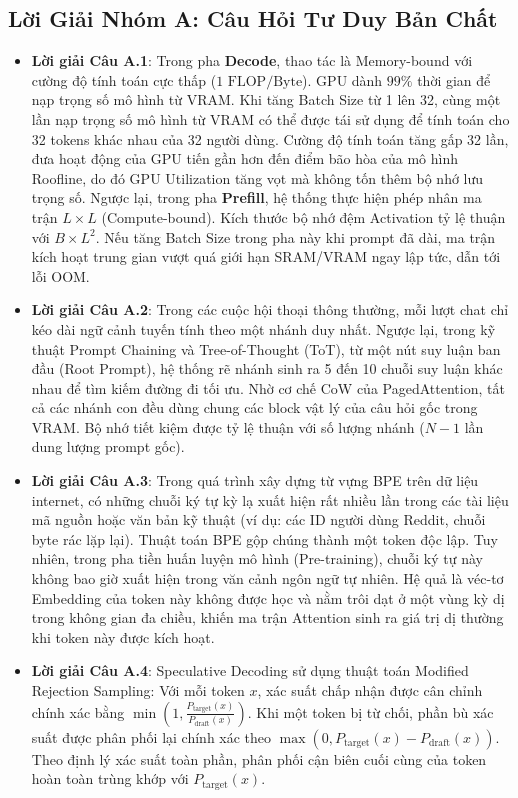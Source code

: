 \subsection{Lời Giải Nhóm A: Câu Hỏi Tư Duy Bản Chất}
\begin{itemize}
  \item \textbf{Lời giải Câu A.1}:
  Trong pha \textbf{Decode}, thao tác là Memory-bound với cường độ tính toán cực thấp ($1\text{ FLOP/Byte}$). GPU dành $99\%$ thời gian để nạp trọng số mô hình từ VRAM. Khi tăng Batch Size từ 1 lên 32, cùng một lần nạp trọng số mô hình từ VRAM có thể được tái sử dụng để tính toán cho 32 tokens khác nhau của 32 người dùng. Cường độ tính toán tăng gấp 32 lần, đưa hoạt động của GPU tiến gần hơn đến điểm bão hòa của mô hình Roofline, do đó GPU Utilization tăng vọt mà không tốn thêm bộ nhớ lưu trọng số.
  Ngược lại, trong pha \textbf{Prefill}, hệ thống thực hiện phép nhân ma trận $L \times L$ (Compute-bound). Kích thước bộ nhớ đệm Activation tỷ lệ thuận với $B \times L^2$. Nếu tăng Batch Size trong pha này khi prompt đã dài, ma trận kích hoạt trung gian vượt quá giới hạn SRAM/VRAM ngay lập tức, dẫn tới lỗi OOM.

  \item \textbf{Lời giải Câu A.2}:
  Trong các cuộc hội thoại thông thường, mỗi lượt chat chỉ kéo dài ngữ cảnh tuyến tính theo một nhánh duy nhất. Ngược lại, trong kỹ thuật Prompt Chaining và Tree-of-Thought (ToT), từ một nút suy luận ban đầu (Root Prompt), hệ thống rẽ nhánh sinh ra 5 đến 10 chuỗi suy luận khác nhau để tìm kiếm đường đi tối ưu. Nhờ cơ chế CoW của PagedAttention, tất cả các nhánh con đều dùng chung các block vật lý của câu hỏi gốc trong VRAM. Bộ nhớ tiết kiệm được tỷ lệ thuận với số lượng nhánh ($N-1$ lần dung lượng prompt gốc).

  \item \textbf{Lời giải Câu A.3}:
  Trong quá trình xây dựng từ vựng BPE trên dữ liệu internet, có những chuỗi ký tự kỳ lạ xuất hiện rất nhiều lần trong các tài liệu mã nguồn hoặc văn bản kỹ thuật (ví dụ: các ID người dùng Reddit, chuỗi byte rác lặp lại). Thuật toán BPE gộp chúng thành một token độc lập. Tuy nhiên, trong pha tiền huấn luyện mô hình (Pre-training), chuỗi ký tự này không bao giờ xuất hiện trong văn cảnh ngôn ngữ tự nhiên. Hệ quả là véc-tơ Embedding của token này không được học và nằm trôi dạt ở một vùng kỳ dị trong không gian đa chiều, khiến ma trận Attention sinh ra giá trị dị thường khi token này được kích hoạt.

  \item \textbf{Lời giải Câu A.4}:
  Speculative Decoding sử dụng thuật toán Modified Rejection Sampling: Với mỗi token $x$, xác suất chấp nhận được cân chỉnh chính xác bằng $\min\left(1, \frac{P_{\text{target}}(x)}{P_{\text{draft}}(x)}\right)$. Khi một token bị từ chối, phần bù xác suất được phân phối lại chính xác theo $\max(0, P_{\text{target}}(x) - P_{\text{draft}}(x))$. Theo định lý xác suất toàn phần, phân phối cận biên cuối cùng của token hoàn toàn trùng khớp với $P_{\text{target}}(x)$.


\end{itemize}
